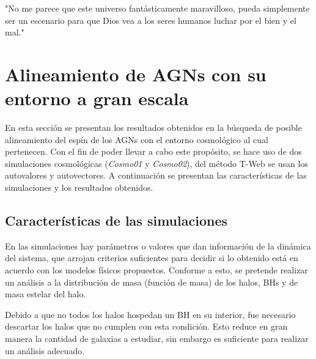 \begin{savequote}[60mm]
"No me parece que este universo fantásticamente maravilloso, pueda simplemente ser un escenario para que Dios vea a los seres humanos luchar por el bien y el mal."
\end{savequote}




\chapter{Alineamiento de AGNs con su entorno a gran escala}
\label{cha:cosmic_web}

En esta sección se presentan los resultados obtenidos en la búsqueda de posible alineamiento del espín de los AGNs con el entorno cosmológico al cual pertenecen. Con el fin de poder llevar a cabo este propósito, se hace uso de dos simulaciones cosmológicas ({\it{Cosmo01}} y {\it{Cosmo02}}),  del método T-Web se usan los autovalores y autovectores. A continuación se presentan las características de las simulaciones y  los resultados obtenidos.

\section{Características de las simulaciones}
\label{sec: propiedades en las simulaciones}

En las simulaciones hay parámetros o valores que dan información de la dinámica del sistema,  que arrojan criterios suficientes para decidir si lo obtenido está en acuerdo con los modelos físicos propuestos. 
Conforme a esto, se pretende realizar un análisis a la distribución de masa (función de masa) de los halos, BHs y de masa estelar del halo. 

Debido a que no todos los halos hospedan un BH en su interior, fue necesario descartar los halos que no cumplen con esta condición. Esto reduce en gran manera la cantidad de galaxias a estudiar, sin embargo es suficiente para realizar un análisis adecuado.

